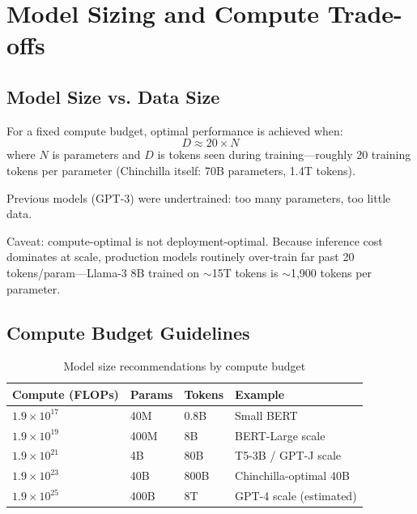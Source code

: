 \section{Model Sizing and Compute Trade-offs}
\label{sec:model_sizing}

\subsection{Model Size vs. Data Size}

\begin{keyinsight}
For a fixed compute budget, optimal performance is achieved when:
\begin{equation}
D \approx 20 \times N
\end{equation}
where $N$ is parameters and $D$ is tokens seen during training---roughly 20 training tokens per parameter (Chinchilla itself: 70B parameters, 1.4T tokens).

Previous models (GPT-3) were undertrained: too many parameters, too little data.

Caveat: compute-optimal is not deployment-optimal. Because inference cost dominates at scale, production models routinely over-train far past 20 tokens/param---Llama-3 8B trained on $\sim$15T tokens is $\sim$1{,}900 tokens per parameter.
\end{keyinsight}

\subsection{Compute Budget Guidelines}

\begin{table}[H]
\centering
\caption{Model size recommendations by compute budget}
\begin{tabularx}{\textwidth}{lXXX}
\toprule
\textbf{Compute (FLOPs)} & \textbf{Params} & \textbf{Tokens} & \textbf{Example} \\
\midrule
$1.9 \times 10^{17}$ & 40M & 0.8B & Small BERT \\
$1.9 \times 10^{19}$ & 400M & 8B & BERT-Large scale \\
$1.9 \times 10^{21}$ & 4B & 80B & T5-3B / GPT-J scale \\
$1.9 \times 10^{23}$ & 40B & 800B & Chinchilla-optimal 40B \\
$1.9 \times 10^{25}$ & 400B & 8T & GPT-4 scale (estimated) \\
\bottomrule
\end{tabularx}
\end{table}

